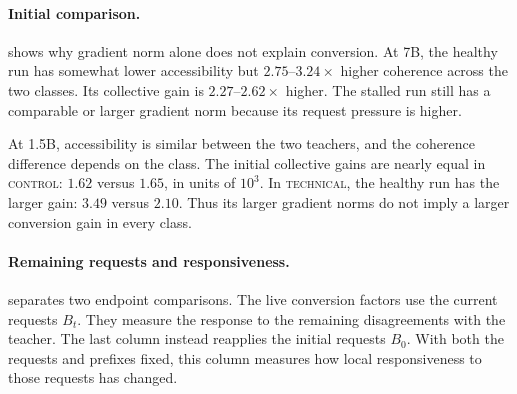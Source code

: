 \begin{table}[htb]
\centering\small\setlength{\tabcolsep}{4.2pt}

\caption{\textbf{Initial conversion estimates by semantic class.} Each row uses $n=80$ positions selected for one teacher and class. $P$ and $A$ use measurements at individual positions. $C$ uses the finite-sample correction above. $\Xi$ and $\|u\|$ are approximate values computed from these estimates. Comparisons are within scale and parameterization.}
\label{tab:collective-initial}
\end{table}

\paragraph{Initial comparison.}
 shows why gradient norm alone does not explain conversion. At 7B, the healthy run has somewhat lower accessibility but $2.75$--$3.24\times$ higher coherence across the two classes. Its collective gain is $2.27$--$2.62\times$ higher. The stalled run still has a comparable or larger gradient norm because its request pressure is higher.

At 1.5B, accessibility is similar between the two teachers, and the coherence difference depends on the class. The initial collective gains are nearly equal in \textsc{control}: $1.62$ versus $1.65$, in units of $10^3$. In \textsc{technical}, the healthy run has the larger gain: $3.49$ versus $2.10$. Thus its larger gradient norms do not imply a larger conversion gain in every class.

\paragraph{Remaining requests and responsiveness.}
 separates two endpoint comparisons. The live conversion factors use the current requests $B_t$. They measure the response to the remaining disagreements with the teacher. The last column instead reapplies the initial requests $B_0$. With both the requests and prefixes fixed, this column measures how local responsiveness to those requests has changed.

\begin{table}[htb]
\centering\footnotesize\setlength{\tabcolsep}{3.2pt}

\caption{\textbf{Remaining requests and responsiveness at the endpoint.} The positions are the same as at initialization. The pressure and live conversion columns use the current requests $B_t$; the last column uses the initial requests $B_0$. All diagnostic columns are ratios to their initial values. Endpoints are step 200, except for stalled 7B at step 150. Coherence estimates are rounded, especially at healthy endpoints.}
\label{tab:collective-endpoints}
\end{table}

